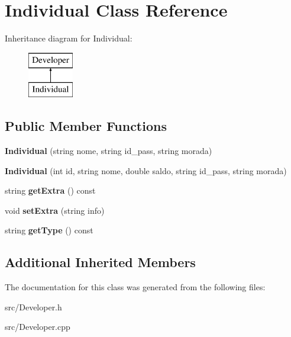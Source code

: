 \hypertarget{class_individual}{\section{Individual Class Reference}
\label{class_individual}
}
Inheritance diagram for Individual\+:\begin{figure}[H]
\begin{center}
\leavevmode
\includegraphics[height=2.000000cm]{class_individual}
\end{center}
\end{figure}
\subsection*{Public Member Functions}
\begin{DoxyCompactItemize}
\item 
\hypertarget{class_individual_ae0f33438c54e6ecfffe2996f8c5f8053}{{\bfseries Individual} (string nome, string id\+\_\+pass, string morada)}\label{class_individual_ae0f33438c54e6ecfffe2996f8c5f8053}

\item 
\hypertarget{class_individual_a10c8376da81c75738c246c55d0ca0fa6}{{\bfseries Individual} (int id, string nome, double saldo, string id\+\_\+pass, string morada)}\label{class_individual_a10c8376da81c75738c246c55d0ca0fa6}

\item 
\hypertarget{class_individual_ace4ce273559198ae0e57ec1b93381eba}{string {\bfseries get\+Extra} () const }\label{class_individual_ace4ce273559198ae0e57ec1b93381eba}

\item 
\hypertarget{class_individual_a85830ece8fc5dcce9ae340d0d2f931f5}{void {\bfseries set\+Extra} (string info)}\label{class_individual_a85830ece8fc5dcce9ae340d0d2f931f5}

\item 
\hypertarget{class_individual_a9051c636cb732e23b26307f17c171f36}{string {\bfseries get\+Type} () const }\label{class_individual_a9051c636cb732e23b26307f17c171f36}

\end{DoxyCompactItemize}
\subsection*{Additional Inherited Members}


The documentation for this class was generated from the following files\+:\begin{DoxyCompactItemize}
\item 
src/Developer.\+h\item 
src/Developer.\+cpp\end{DoxyCompactItemize}
